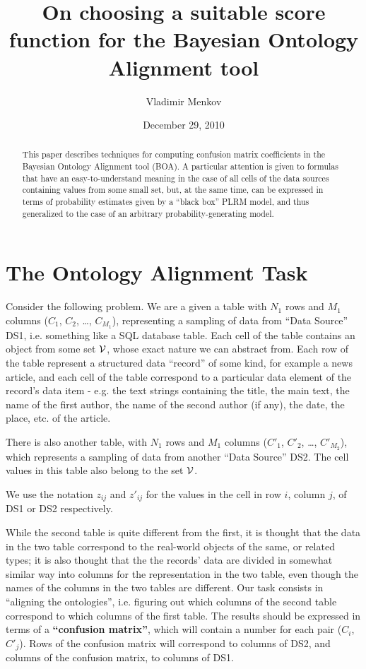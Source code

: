 \documentclass[12pt]{article}
\begin{document}
\title{On choosing a suitable score function for the Bayesian Ontology Alignment tool}
\date{December 29, 2010}
\author{Vladimir Menkov}

\maketitle

\begin{abstract}
This paper describes techniques for computing confusion matrix
coefficients in the Bayesian Ontology Alignment tool (BOA). A
particular attention is given to formulas that have an
easy-to-understand meaning in the case of all cells of the data
sources containing values from some small set, but, at the same time,
can be expressed in terms of probability estimates given by a ``black
box'' PLRM model, and thus generalized to the case of an arbitrary
probability-generating model.
\end{abstract}

\section{The Ontology Alignment Task}

Consider the following problem. We are a given a table with $N_1$ rows
and $M_1$ columns ($C_1$, $C_2$, \dots, $C_{M_1}$), representing a
sampling of data from ``Data Source'' DS1, i.e. something like a SQL
database table. Each cell of the table contains an object from some
set $\cal{V}$, whose exact nature we can abstract from. Each row of
the table represent a structured data ``record'' of some kind, for
example a news article, and each cell of the table correspond to a
particular data element of the record's data item - e.g. the text
strings containing the title, the main text, the name of the first
author, the name of the second author (if any), the date, the place,
etc. of the article. 

There is also another table, with $N_1$ rows and $M_1$ columns
($C'_1$, $C'_2$, \dots, $C'_{M_2}$), which represents a sampling of
data from another ``Data Source'' DS2. The cell values in this table
also belong to the set $\cal{V}$.

We use the notation $z_{ij}$ and $z'_{ij}$ for the values in the cell
in row $i$, column $j$, of DS1 or DS2 respectively.

While the second table is quite different from the first, it is
thought that the data in the two table correspond to the real-world
objects of the same, or related types; it is also thought that the the
records' data are divided in somewhat similar way into columns for the
representation in the two table, even though the names of the columns
in the two tables are different. Our task consists in ``aligning the
ontologies'', i.e. figuring out which columns of the second table
correspond to which columns of the first table. The results should be
expressed in terms of a {\bf ``confusion matrix''}, which will contain a
number for each pair ($C_i$, $C'_j$). Rows of the confusion matrix
will correspond to columns of DS2, and columns of the confusion
matrix, to columns of DS1.
\end{document}
